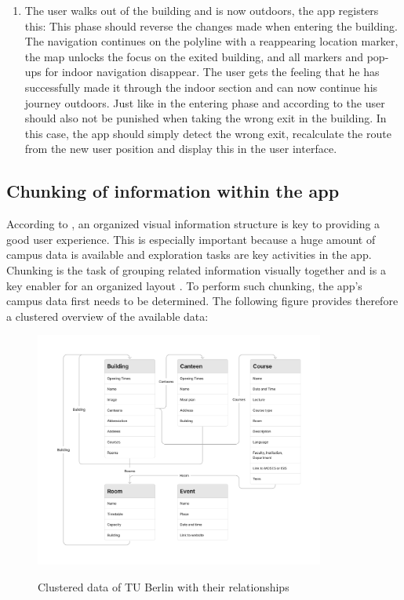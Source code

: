 \begin{enumerate}
    \item The user walks out of the building and is now outdoors, the app registers this: This phase should reverse the changes made when entering the building. The navigation continues on the polyline with a reappearing location marker, the map unlocks the focus on the exited building, and all markers and pop-ups for indoor navigation disappear. The user gets the feeling that he has successfully made it through the indoor section and can now continue his journey outdoors. Just like in the entering phase and according to \cite{postels_law} the user should also not be punished when taking the wrong exit in the building. In this case, the app should simply detect the wrong exit, recalculate the route from the new user position and display this in the user interface.
\end{enumerate}


\subsection{Chunking of information within the app}
According to \cite{millers_law}, an organized visual information structure is key to providing a good user experience. This is especially important because a huge amount of campus data is available and exploration tasks are key activities in the app. Chunking is the task of grouping related information visually together and is a key enabler for an organized layout \cite{millers_law}. To perform such chunking, the app's campus data first needs to be determined. The following figure provides therefore a clustered overview of the available data:

\begin{figure}[H]
	\centering
	\includegraphics[width=0.85\textwidth]{images/information_cluster.png}\\
	\caption{Clustered data of TU Berlin with their relationships}
\end{figure}


